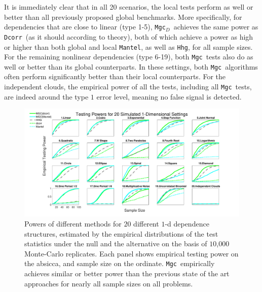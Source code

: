 \documentclass[11pt]{article}
\providecommand{\sct}[1]{{\sc \texttt{#1}}}
\newcommand{\Mgc}{\sct{Mgc}}
\newcommand{\Mgcd}{\sct{Mgc$_D$}}
\newcommand{\Hhg}{\sct{Hhg}}
\newcommand{\Dcorr}{\sct{Dcorr}}
\newcommand{\Mcorr}{\sct{Mcorr}}
\newcommand{\Mantel}{\sct{Mantel}}
\begin{document}
It is immediately clear that in all 20 scenarios, the local tests perform as well or better than all previously proposed global benchmarks.  
More specifically, for dependencies that are close to linear (type 1-5), \Mgcd~achieves the same power as \Dcorr~(as it should according to theory), both of which achieve a power as high or higher than both global and local \Mantel, as well as \Hhg, for all sample sizes.  
For the remaining nonlinear dependencies (type 6-19), both \Mgc~tests also do as well or better than its global counterparts.  In these settings, both \Mgc~algorithms often perform significantly better than their local counterparts.
For the independent clouds,  the empirical power of all the tests, including all \Mgc~tests, are indeed around the type $1$ error level, meaning no false signal is detected. 


\begin{figure}[htbp]
\includegraphics[width=1.0\textwidth]{Figures/Fig1DPower}
\caption{
Powers of different methods for $20$ different $1$-d dependence structures, estimated by the empirical distributions of the test statistics under the null and the alternative on the basis of $10$,$000$ Monte-Carlo replicates.
Each panel shows empirical testing power on the absicca, and sample size on the ordinate.
\Mgc~empirically achieves similar or better power than the previous state of the art approaches for nearly all sample sizes on all problems.}
\label{fig:1D}
\end{figure}
\end{document}
